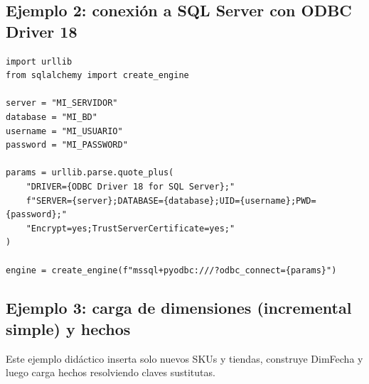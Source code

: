 \documentclass[12pt]{article}
\begin{document}
\subsection{Ejemplo 2: conexión a SQL Server con ODBC Driver 18}
\begin{lstlisting}[style=python, caption={Conexión con SQLAlchemy + ODBC Driver 18}]
import urllib
from sqlalchemy import create_engine

server = "MI_SERVIDOR"
database = "MI_BD"
username = "MI_USUARIO"
password = "MI_PASSWORD"

params = urllib.parse.quote_plus(
    "DRIVER={ODBC Driver 18 for SQL Server};"
    f"SERVER={server};DATABASE={database};UID={username};PWD={password};"
    "Encrypt=yes;TrustServerCertificate=yes;"
)

engine = create_engine(f"mssql+pyodbc:///?odbc_connect={params}")
\end{lstlisting}

\subsection{Ejemplo 3: carga de dimensiones (incremental simple) y hechos}
Este ejemplo didáctico inserta solo nuevos SKUs y tiendas, construye DimFecha y luego carga hechos resolviendo claves sustitutas.
\end{document}
